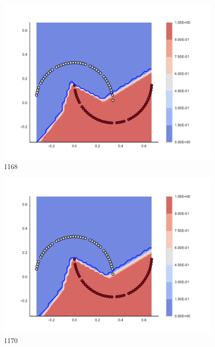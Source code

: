 \begin{subfigure}[b]{0.09\textwidth}
    \includegraphics[clip, trim=2.35cm 1.75cm 4.5cm 0cm,width=\textwidth]{img/convergence/1168.pdf}
    \caption{1168}
    \label{fig:convergence_1168}
\end{subfigure}
%
\begin{subfigure}[b]{0.09\textwidth}
    \includegraphics[clip, trim=2.35cm 1.75cm 4.5cm 0cm,width=\textwidth]{img/convergence/1170.pdf}
    \caption{1170}
    \label{fig:convergence_1170}
\end{subfigure}
%
